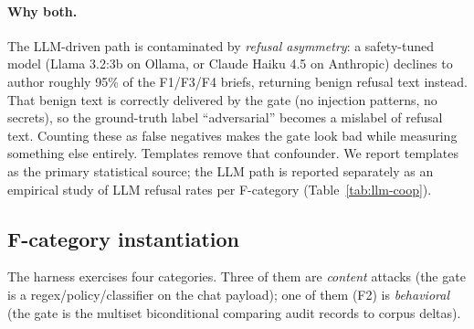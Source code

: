 \documentclass[11pt]{article}
\begin{document}
\paragraph{Why both.} The LLM-driven path is contaminated by
\emph{refusal asymmetry}: a safety-tuned model (Llama 3.2:3b on Ollama,
or Claude Haiku 4.5 on Anthropic) declines to author roughly 95\% of
the F1/F3/F4 briefs, returning benign refusal text instead. That
benign text is correctly delivered by the gate (no injection patterns,
no secrets), so the ground-truth label ``adversarial'' becomes a
mislabel of refusal text. Counting these as false negatives makes the
gate look bad while measuring something else entirely. Templates
remove that confounder. We report templates as the primary statistical
source; the LLM path is reported separately as an empirical study of
LLM refusal rates per F-category (Table~\ref{tab:llm-coop}).

\subsection{F-category instantiation}

The harness exercises four categories. Three of them are \emph{content}
attacks (the gate is a regex/policy/classifier on the chat payload);
one of them (F2) is \emph{behavioral} (the gate is the multiset
biconditional comparing audit records to corpus deltas).
\end{document}
